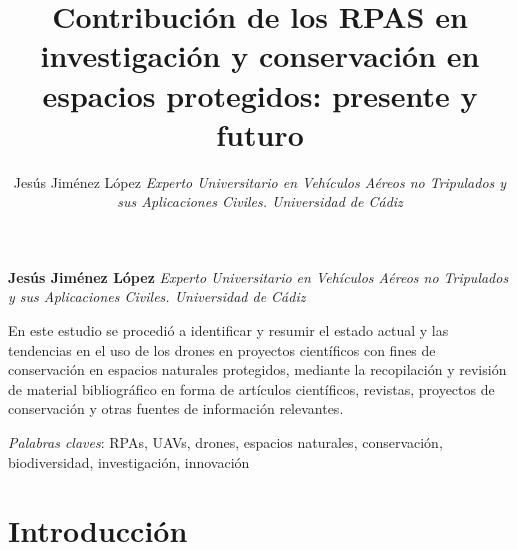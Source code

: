 \documentclass[11pt,]{article}
\title{Contribución de los RPAS en investigación y conservación en espacios
protegidos: presente y futuro  }
\author{\Large Jesús Jiménez López\vspace{0.05in} \newline\normalsize\emph{Experto Universitario en Vehículos Aéreos no Tripulados y sus
Aplicaciones Civiles. Universidad de Cádiz}  }
\date{}
\newcommand*{\authorfont}{\fontfamily{phv}\selectfont}
\renewenvironment{abstract}
 {{%
    \setlength{\leftmargin}{0mm}
    \setlength{\rightmargin}{\leftmargin}%
  }%
  \relax}
 {\endlist}
\begin{document}
	
%

{%
\setlength{\parindent}{0pt}
\thispagestyle{plain}
{\fontsize{16}{20}\selectfont\raggedright 
\maketitle  %

}

{
   \vskip 13.5pt\relax \normalsize\fontsize{10}{12} 
\textbf{\authorfont Jesús Jiménez López} \hskip 15pt \vskip 8.5pt  \emph{\small Experto Universitario en Vehículos Aéreos no Tripulados y sus
Aplicaciones Civiles. Universidad de Cádiz}   

}

}






\begin{abstract}

    \hbox{\vrule height .2pt width 39.14pc}

    \vskip 8.5pt %

\noindent En este estudio se procedió a identificar y resumir el estado actual y
las tendencias en el uso de los drones en proyectos científicos con
fines de conservación en espacios naturales protegidos, mediante la
recopilación y revisión de material bibliográfico en forma de artículos
científicos, revistas, proyectos de conservación y otras fuentes de
información relevantes.


\vskip 8.5pt \noindent \emph{Palabras claves}: RPAs, UAVs, drones, espacios naturales, conservación, biodiversidad,
investigación, innovación \par

    \hbox{\vrule height .2pt width 39.14pc}



\end{abstract}


{
\hypersetup{linkcolor=black}
\setcounter{tocdepth}{2}
\tableofcontents
}


\vskip 6.5pt

\noindent \doublespacing \section{Introducción}\label{introduccion}
\end{document}
